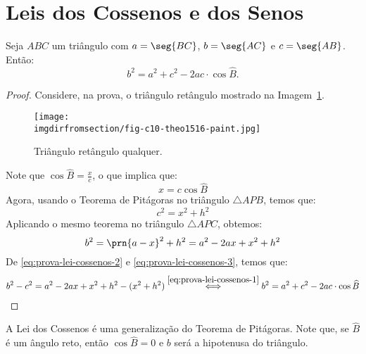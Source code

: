 \section{Leis dos Cossenos e dos Senos}

\begin{theorem}
    Seja $ABC$ um triângulo com $a = \seg {BC}$, $b = \seg {AC}$ e $c = \seg
{AB}$. Então:
$$b^2 = a^2 + c^2 - 2 ac \cdot \cos \widehat B.$$
\end{theorem}

\begin{proof}
    Considere, na prova, o triângulo retângulo mostrado na Imagem~\ref{img:prova-lei-dos-cossenos}. %
    \begin{figure}[H]
        \centering
        \texttt{[image: \\imgdirfromsection/fig-c10-theo1516-paint.jpg]}
        \caption{Triângulo retângulo qualquer.}
        \label{img:prova-lei-dos-cossenos}
    \end{figure}
    Note que $\cos \widehat B = \frac x c$, o que implica que:
    \begin{equation}
    \label{eq:prova-lei-cossenos-1}
        x = c \cos \widehat B
    \end{equation}
    Agora, usando o Teorema de Pitágoras no triângulo $\triangle APB$, temos que:
    \begin{equation}
    \label{eq:prova-lei-cossenos-2}
        c^2 = x^2 + h^2
    \end{equation}
    Aplicando o mesmo teorema no triângulo $\triangle APC$, obtemos:
    \begin{equation}
    \label{eq:prova-lei-cossenos-3}
        b^2 = \prn{a-x}^2+h^2 = a^2 - 2ax+x^2 + h^2
    \end{equation}
    De \ref{eq:prova-lei-cossenos-2} e \ref{eq:prova-lei-cossenos-3}, temos que:
    \begin{align*}
        b^2 - c^2 = a^2 - 2ax + x^2 + h^2    -(x^2 + h^2) \stackrel{\ref{eq:prova-lei-cossenos-1}}{\iff} b^2 = a^2 + c^2 -2ac \cdot \cos \widehat B
    \end{align*}
\end{proof}

\begin{remark}
    A Lei dos Cossenos é uma generalização do Teorema de Pitágoras. Note
que, se $\widehat B$ é um ângulo reto, então $\cos \widehat B = 0$ e
$b$ será a hipotenusa do triângulo.
\end{remark}

